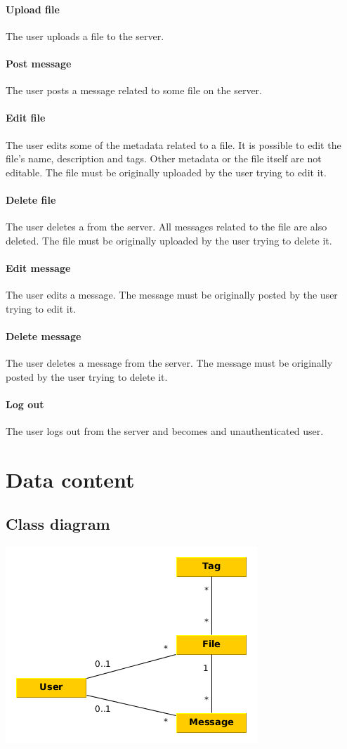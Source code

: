 \documentclass[10pt,a4paper]{article}
\begin{document}
\paragraph{Upload file}
The user uploads a file to the server.
\paragraph{Post message}
The user posts a message related to some file on the server.
\paragraph{Edit file}
The user edits some of the metadata related to a file. It is possible to edit the file's name, description and tags. Other metadata or the file itself are not editable. The file must be originally uploaded by the user trying to edit it.
\paragraph{Delete file}
The user deletes a from the server. All messages related to the file are also deleted. The file must be originally uploaded by the user trying to delete it.
\paragraph{Edit message}
The user edits a message. The message must be originally posted by the user trying to edit it.
\paragraph{Delete message}
The user deletes a message from the server. The message must be originally posted by the user trying to delete it.
\paragraph{Log out}
The user logs out from the server and becomes and unauthenticated user.

\section{Data content}
\subsection{Class diagram}
\includegraphics[scale=0.7]{diagrams/class.png}
\end{document}
